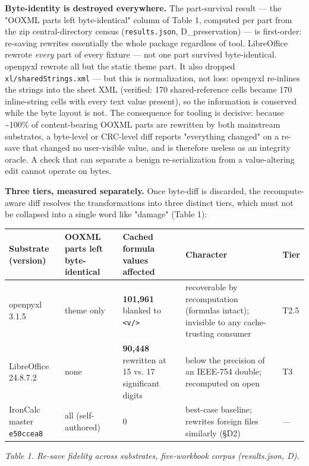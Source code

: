 \documentclass[
]{article}
\newcounter{none} %
\begin{document}
\textbf{Byte-identity is destroyed everywhere.} The part-survival result
--- the "OOXML parts left byte-identical" column of Table 1, computed
per part from the zip central-directory census (\texttt{results.json},
D\_preservation) --- is first-order: re-saving rewrites essentially the
whole package regardless of tool. LibreOffice rewrote \emph{every} part
of every fixture --- not one part survived byte-identical. openpyxl
rewrote all but the static theme part. It also dropped
\texttt{xl/sharedStrings.xml} --- but this is normalization, not loss:
openpyxl re-inlines the strings into the sheet XML (verified: 170
shared-reference cells became 170 inline-string cells with every text
value present), so the information is conserved while the byte layout is
not. The consequence for tooling is decisive: because
\textasciitilde100\% of content-bearing OOXML parts are rewritten by
both mainstream substrates, a byte-level or CRC-level diff reports
"everything changed" on a re-save that changed no user-visible value,
and is therefore useless as an integrity oracle. A check that can
separate a benign re-serialization from a value-altering edit cannot
operate on bytes.

\textbf{Three tiers, measured separately.} Once byte-diff is discarded,
the recompute-aware diff resolves the transformations into three
distinct tiers, which must not be collapsed into a single word like
"damage" (Table 1):

{\def\LTcaptype{none} %
\begin{longtable}[]{@{}lllll@{}}
\toprule\noalign{}
Substrate (version) & OOXML parts left byte-identical & Cached formula
values affected & Character & Tier \\
\midrule\noalign{}
\endhead
\bottomrule\noalign{}
\endlastfoot
openpyxl 3.1.5 & theme only & \textbf{101,961} blanked to
\texttt{\textless{}v/\textgreater{}} & recoverable by recomputation
(formulas intact); invisible to any cache-trusting consumer & T2.5 \\
LibreOffice 24.8.7.2 & none & \textbf{90,448} rewritten at 15 vs. 17
significant digits & below the precision of an IEEE-754 double;
recomputed on open & T3 \\
IronCalc master \texttt{e50ccea8} & all (self-authored) & 0 & best-case
baseline; rewrites foreign files similarly (§D2) & --- \\
\end{longtable}
}

\emph{Table 1. Re-save fidelity across substrates, five-workbook corpus
(results.json, D).}
\end{document}

